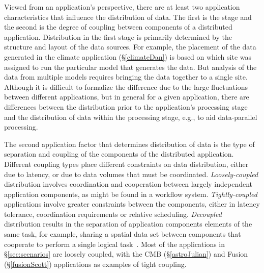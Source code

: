 Viewed from an application's perspective, there are at least two
application characteristics that influence the distribution of
data. The first is the stage and the second is the degree of coupling
between components of a distributed application. Distribution in the
first stage is primarily determined by the structure and layout of the
data sources. For example, the placement of the data generated in the
climate application (\S\ref{climateDan}) is based on which site was
assigned to run the particular model that generates the data. But
analysis of the data from multiple models requires bringing the data
together to a single site.  Although it is difficult to formalize the
difference due to the large fluctuations between different
applications, but in general for a given application, there are
differences between the distribution prior to the application's
processing stage and the distribution of data within the processing
stage, e.g., to aid data-parallel processing.


The second application factor that determines distribution of data is
the type of separation and coupling of the components of the
distributed application. Different coupling types place different
constraints on data distribution, either due to latency, or due to
data volumes that must be coordinated. %
\emph{Loosely-coupled} distribution involves coordination and
cooperation between largely independent application components, as
might be found in a workflow system. \emph{Tightly-coupled}
applications involve greater constraints between the components,
either in latency tolerance, coordination requirements or relative
scheduling. \emph{Decoupled} distribution results in the separation of
application components elements of the same task, for example, sharing
a spatial data set between components that cooperate to perform a
single logical task~\cite{dpa_surveypaper}.
Most of the applications in \S\ref{sec:scenarios} are loosely coupled,
with the CMB (\S\ref{astroJulian}) and Fusion (\S\ref{fusionScott})
applications as examples of tight coupling.



